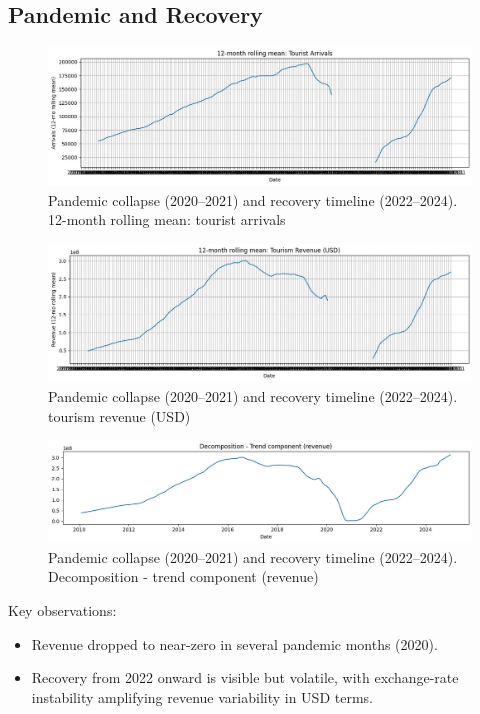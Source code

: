 \documentclass[12pt,a4paper]{article}
\begin{document}
\subsection{Pandemic and Recovery}
\begin{figure}[H]
  \centering
  \includegraphics[width=0.9\linewidth]{figure5.jpg}
  \caption{Pandemic collapse (2020--2021) and recovery timeline (2022--2024). 12-month rolling mean: tourist arrivals}
\end{figure}

\begin{figure}[H]
  \centering
  \includegraphics[width=0.9\linewidth]{figure6.jpg}
  \caption{Pandemic collapse (2020--2021) and recovery timeline (2022--2024). tourism revenue (USD)}
\end{figure}

\begin{figure}[H]
  \centering
  \includegraphics[width=0.9\linewidth]{figure7.jpg}
  \caption{Pandemic collapse (2020--2021) and recovery timeline (2022--2024). Decomposition - trend component (revenue)}
\end{figure}

Key observations:
\begin{itemize}
  \item Revenue dropped to near-zero in several pandemic months (2020).
  \item Recovery from 2022 onward is visible but volatile, with exchange-rate instability amplifying revenue variability in USD terms.
\end{itemize}
\end{document}
